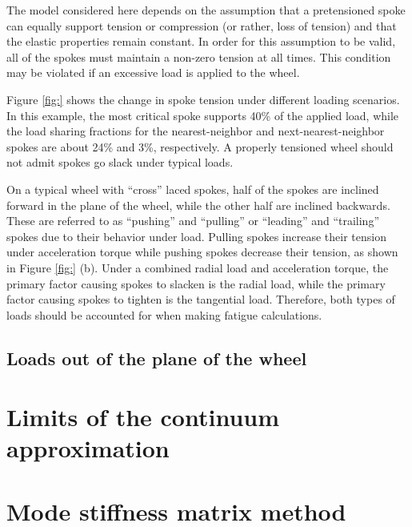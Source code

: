 \documentclass[../thesis.tex]{subfiles}
\begin{document}
The model considered here depends on the assumption that a pretensioned spoke can equally support tension or compression (or rather, loss of tension) and that the elastic properties remain constant. In order for this assumption to be valid, all of the spokes must maintain a non-zero tension at all times. This condition may be violated if an excessive load is applied to the wheel.

Figure \ref{fig:} shows the change in spoke tension under different loading scenarios. In this example, the most critical spoke supports 40\% of the applied load, while the load sharing fractions for the nearest-neighbor and next-nearest-neighbor spokes are about 24\% and 3\%, respectively. A properly tensioned wheel should not admit spokes go slack under typical loads.

On a typical wheel with ``cross'' laced spokes, half of the spokes are inclined forward in the plane of the wheel, while the other half are inclined backwards. These are referred to as ``pushing'' and ``pulling'' or ``leading'' and ``trailing'' spokes due to their behavior under load. Pulling spokes increase their tension under acceleration torque while pushing spokes decrease their tension, as shown in Figure \ref{fig:} (b). Under a combined radial load and acceleration torque, the primary factor causing spokes to slacken is the radial load, while the primary factor causing spokes to tighten is the tangential load. Therefore, both types of loads should be accounted for when making fatigue calculations.



\subsection{Loads out of the plane of the wheel}


\section{Limits of the continuum approximation}


\section{Mode stiffness matrix method}
\end{document}
